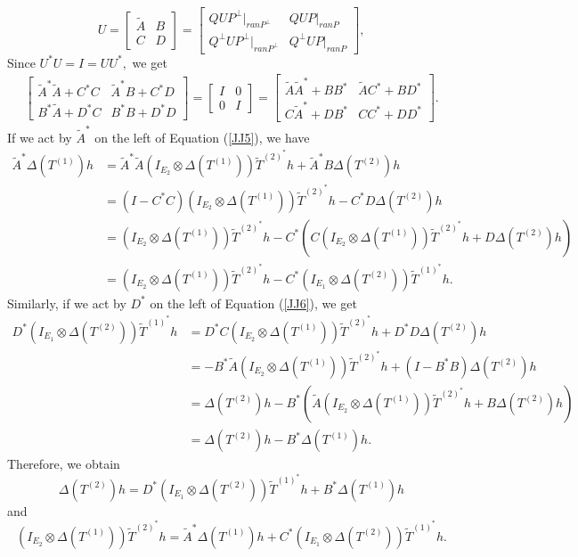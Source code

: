 \documentclass[12pt]{amsart}
\numberwithin{equation}{section}
\theoremstyle{plain}
\newcommand{\ot}{\otimes}
\newcommand{\wt}{\widetilde}
\newcommand{\wT}{\wt{T}}
\begin{document}
	\begin{equation}
		U = \begin{bmatrix}\widetilde{A}&B\\C&D\end{bmatrix}=\begin{bmatrix}QUP^{\perp}|_{ran{P^{\perp}}}& QUP|_{ran{P}}\\Q^{\perp}U P^{\perp}|_{ran{ P^{\perp}}}&Q^{\perp}UP|_{ran{P}}\end{bmatrix},
	\end{equation}
Since $U^*U = I = UU^*,$ we get
\begin{align*}
	\begin{bmatrix}\widetilde{A}^*\widetilde{A}+C^*C&\widetilde{A}^*B+C^*D\\B^*\widetilde{A}+D^*C&B^*B+D^*D\end{bmatrix}=\begin{bmatrix}I&0\\0&I\end{bmatrix}=\begin{bmatrix}\widetilde{A}\widetilde{A}^*+BB^*&\widetilde{A}C^*+BD^*\\C\widetilde{A}^*+DB^*&CC^*+DD^*\end{bmatrix}.
\end{align*}
If we act by $\widetilde{A}^*$ on the left of Equation (\ref{JJ5}), we have
\begin{align*}
	\widetilde{A}^*\Delta(T^{(1)})h&= \widetilde{A}^*\widetilde{A}(I_{E_2} \ot \Delta(T^{(1)}))\wT^{(2)^*}h+
	\widetilde{A}^*B\Delta(T^{(2)})h\\&=(I-C^*C)(I_{E_2} \ot \Delta(T^{(1)}))\wT^{(2)^*}h-C^*D\Delta(T^{(2)})h\\&=(I_{E_2} \ot \Delta(T^{(1)}))\wT^{(2)^*}h-C^*(C(I_{E_2} \ot \Delta(T^{(1)}))\wT^{(2)^*}h+
	D\Delta(T^{(2)})h)\\&=(I_{E_2} \ot \Delta(T^{(1)}))\wT^{(2)^*}h-C^*(I_{E_1}\ot \Delta(T^{(2)}))\wT^{(1)^*}h.
\end{align*} Similarly, if we act by $D^*$ on the left of Equation (\ref{JJ6}), we get
\begin{align*}
	D^*(I_{E_1}\ot \Delta(T^{(2)}))\wT^{(1)^*}h&= D^*C(I_{E_2} \ot \Delta(T^{(1)}))\wT^{(2)^*}h+
	D^*D\Delta(T^{(2)})h \\&=-B^*\widetilde{A}(I_{E_2} \ot \Delta(T^{(1)}))\wT^{(2)^*}h+(I-B^*B)\Delta(T^{(2)})h\\&=\Delta(T^{(2)})h-B^*(\widetilde{A}(I_{E_2} \ot \Delta(T^{(1)}))\wT^{(2)^*}h+
	B\Delta(T^{(2)})h)\\&=\Delta(T^{(2)})h-B^*\Delta(T^{(1)})h.
\end{align*} Therefore, we obtain
\begin{equation}\label{JJ7}
	\Delta(T^{(2)})h=D^*(I_{E_1}\ot \Delta(T^{(2)}))\wT^{(1)^*}h+B^*\Delta(T^{(1)})h
\end{equation}
and 
\begin{equation}\label{JJ8}
	(I_{E_2} \ot \Delta(T^{(1)}))\wT^{(2)^*}h=	\widetilde{A}^*\Delta(T^{(1)})h+C^*(I_{E_1}\ot \Delta(T^{(2)}))\wT^{(1)^*}h.
\end{equation}
\end{document}
